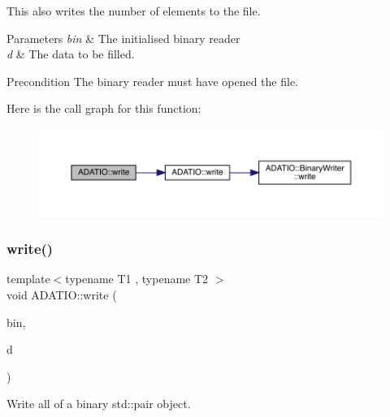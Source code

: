 This also writes the number of elements to the file. 
\begin{DoxyParams}{Parameters}
{\em bin} & The initialised binary reader \\
\hline
{\em d} & The data to be filled.\\
\hline
\end{DoxyParams}
\begin{DoxyPrecond}{Precondition}
The binary reader must have opened the file. 
\end{DoxyPrecond}
Here is the call graph for this function\+:
\nopagebreak
\begin{figure}[H]
\begin{center}
\leavevmode
\includegraphics[width=350pt]{d0/dba/namespaceADATIO_acc2655a91a7a0608906b55f7533bde55_cgraph}
\end{center}
\end{figure}
\mbox{\label{namespaceADATIO_a29572ec079e7257de618b505e0baee59}} 
\subsubsection{\texorpdfstring{write()}{write()}\hspace{0.1cm}{\footnotesize\ttfamily [25/25]}}
{\footnotesize\ttfamily template$<$typename T1 , typename T2 $>$ \\
void A\+D\+A\+T\+I\+O\+::write (\begin{DoxyParamCaption}\item[{\mbox{\hyperlink{classADATIO_1_1BinaryWriter}{Binary\+Writer}} \&}]{bin,  }\item[{const std\+::pair$<$ T1, T2 $>$ \&}]{d }\end{DoxyParamCaption})\hspace{0.3cm}{\ttfamily [inline]}}



Write all of a binary std\+::pair object. 

